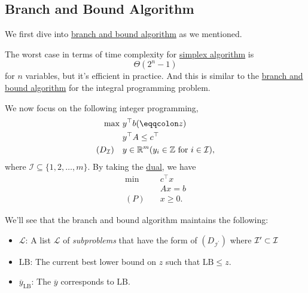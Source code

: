 \subsection{Branch and Bound Algorithm}\label{subsec:branch-and-bound}
We first dive into \hyperref[eg:branch-and-bound]{branch and bound algorithm} as we mentioned.
\begin{prev}
	The worst case in terms of time complexity for \hyperref[algo:simplex-algorithm]{simplex algorithm} is
	\[
		\Theta(2^n - 1)
	\]
	for \(n\) variables, but it's efficient in practice. And this is similar to
	the \hyperref[eg:branch-and-bound]{branch and bound algorithm} for the integral programming problem.
\end{prev}

We now focus on the following integer programming,
\[
	\begin{aligned}
		\max~                   & y^{\top}b(\eqqcolon z)                                                                              \\
		                        & y^{\top}A\leq c^{\top}                                                                              \\
		(D_{\mathcal{I} })\quad & y\in\mathbb{\MakeUppercase{R}}^m(y_{i}\in\mathbb{\MakeUppercase{Z}} \text{ for } i\in \mathcal{I}),
	\end{aligned}
\]
where \(\mathcal{I} \subseteq \{1, 2, \ldots , m\}\). By taking the \hyperref[def:dual]{dual}, we have
\[
	\begin{aligned}
		\min~    & c^{\top}x \\
		         & Ax = b    \\
		(P)\quad & x\geq 0.
	\end{aligned}
\]

We'll see that the branch and bound algorithm maintains the following:
\begin{itemize}
	\item \(\mathcal{L} \): A list \(\mathcal{L} \) of \emph{subproblems} that have the form of \((D_{\mathcal{I^\prime } })\) where \(\mathcal{\MakeUppercase{i}} ^\prime \subset \mathcal{\MakeUppercase{i}}\)
	\item \(\mathrm{LB} \): The current best lower bound on \(z\) such that \(\mathrm{LB}\leq z \).
	\item \(\overline{y}_{\mathrm{LB}}\): The \(\overline{y}\) corresponds to \(\mathrm{LB}\).
\end{itemize}

